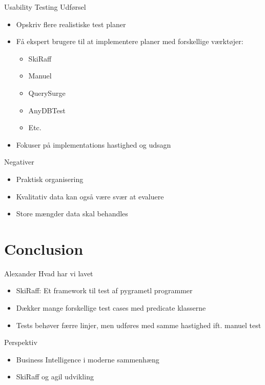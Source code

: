 \begin{frame}{Usability Testing}{}
Udførsel
  \begin{itemize}
    \item<1-> Opskriv flere realistiske test planer
    \item<2-> Få ekspert brugere til at implementere planer med forskellige værktøjer:
	 \begin{itemize}
   	 \item<2-> SkiRaff
    	\item<2-> Manuel
    	\item<2-> QuerySurge
	\item<2-> AnyDBTest
	\item<2-> Etc.
  	\end{itemize}
   \item<3-> Fokuser på implementations hastighed og udsagn
  	\end{itemize}

\pause
\pause
\pause
Negativer
 \begin{itemize}
   \item<4-> Praktisk organisering
    \item<5-> Kvalitativ data kan også være svær at evaluere
    \item<6-> Store mængder data skal behandles
  \end{itemize}
\end{frame}


\section{Conclusion}
\begin{frame}{Alexander}{}
  Hvad har vi lavet
  \begin{itemize}
    \item<1-> SkiRaff: Et framework til test af pygrametl programmer
    \item<2-> Dækker mange forskellige test cases med predicate klasserne
    \item<3-> Tests behøver færre linjer, men udføres med samme hastighed ift. manuel test
  \end{itemize}
\pause
\pause
\pause
Perspektiv
  \begin{itemize}
    \item<4-> Business Intelligence i moderne sammenhæng
    \item<5-> SkiRaff og agil udvikling
  \end{itemize}


\end{frame}